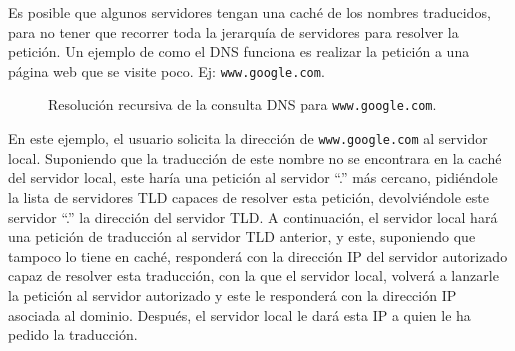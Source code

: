 \documentclass[10pt,a4paper,spanish]{report}
\begin{document}
Es posible que algunos servidores tengan una caché de los nombres traducidos, para no tener que recorrer toda la jerarquía de servidores para resolver la petición. Un ejemplo de como el DNS funciona es realizar la petición a una página web que se visite poco. Ej: \texttt{www.google.com}.

\begin{figure}[H]
\centering

\caption{Resolución recursiva de la consulta DNS para \texttt{www.google.com}.}
\label{tema2_1}
\end{figure}

En este ejemplo, el usuario solicita la dirección de \textcolor{tema2}{\texttt{www.google.com}} al servidor local. Suponiendo que la traducción de este nombre no se encontrara en la caché del servidor local, este haría una petición al servidor ``.'' más cercano, pidiéndole la lista de servidores TLD capaces de resolver esta petición, devolviéndole este servidor ``.'' la dirección del servidor TLD. A continuación, el servidor local hará una petición de traducción al servidor TLD anterior, y este, suponiendo que tampoco lo tiene en caché, responderá con la dirección IP del servidor autorizado capaz de resolver esta traducción, con la que el servidor local, volverá a lanzarle la petición al servidor autorizado y este le responderá con la dirección IP asociada al dominio. Después, el servidor local le dará esta IP a quien le ha pedido la traducción.
\end{document}
